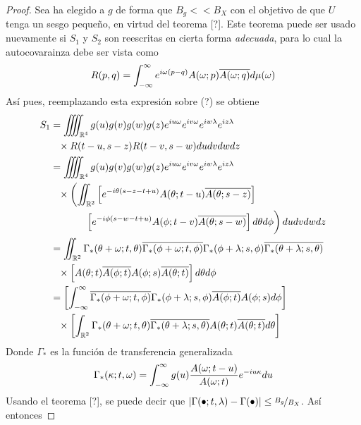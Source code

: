 \begin{proof}
Sea ha elegido a $g$ de forma que $B_g << B_X$ con el objetivo de que $U$ tenga un sesgo pequeño, en virtud del teorema [?]. Este teorema puede ser usado nuevamente si $S_1$ y $S_2$ son reescritas en cierta forma \textit{adecuada}, para lo cual la autocovarainza debe ser vista como
\begin{equation}
R(p,q) = \int_{-\infty}^{\infty} e^{i \omega (p-q)} A(\omega; p)\overline{A(\omega; q)} d\mu(\omega) 
\end{equation}
Así pues, reemplazando esta expresión sobre (?) se obtiene
\begin{align*}
S_1 &=
\iiiint_{\R^{4}} g(u) g(v) g(w) g(z) e^{i u \omega} e^{i v \omega} e^{i w \lambda} e^{i z \lambda} \\
&\pheq \times R(t-u,s-z)R(t-v,s-w) du dv dw dz \\
&= 
\iiiint_{\R^{4}} g(u) g(v) g(w) g(z) e^{i u \omega} e^{i v \omega} e^{i w \lambda} e^{i z \lambda} \\
&\pheq \times \left( 
\iint_{\R^{2}} 
\left[ 
e^{-i \theta (s-z-t+u)} A(\theta; t-u) \overline{A(\theta; s-z)} 
\right] 
\right. \\
&\pheq 
\left. \vphantom{\int} \phantom{times}
\left[ e^{-i \phi (s-w-t+u)} A(\phi; t-v) \overline{A(\theta; s-w)} \right] d\theta d\phi
\right) du dv dw dz
\\
 &= \iint_{\R^{2}} \Gamma_*(\theta+ \omega; t, \theta) \overline{\Gamma_*(\phi + \omega; t, \phi)}
 \Gamma_*(\phi+ \lambda; s, \phi) \overline{\Gamma_*(\theta + \lambda; s, \theta)} \\
 &\pheq \times
 \left[
 A(\theta; t) \overline{A(\phi; t)} A(\phi; s) \overline{A(\theta; t)}
 \right] d\theta d\phi
\\
 &= \left[ \intR \overline{\Gamma_*(\phi + \omega; t, \phi)} \Gamma_*(\phi+ \lambda; s, \phi)
 \overline{A(\phi; t)} A(\phi; s) d\phi \right] \\
 &\pheq \times \left[ \int_{\R^{2}} \Gamma_*(\theta+ \omega; t, \theta) 
  \overline{\Gamma_*(\theta + \lambda; s, \theta)}  
 A(\theta; t)   \overline{A(\theta; t)} d\theta \right] 
\end{align*}
Donde $\Gamma_*$ es la función de transferencia generalizada
\begin{equation}
\Gamma_*(\kappa; t, \omega) = \int_{-\infty}^{\infty} g(u) \frac{A(\omega; t-u)}{A(\omega; t)} e^{-i u \kappa} du
\end{equation}
Usando el teorema [?], se puede decir que $\left| \Gamma(\bullet; t, \lambda) - \Gamma(\bullet) \right| \leq \nicefrac{B_g}{B_X}$. Así entonces

\end{proof}

